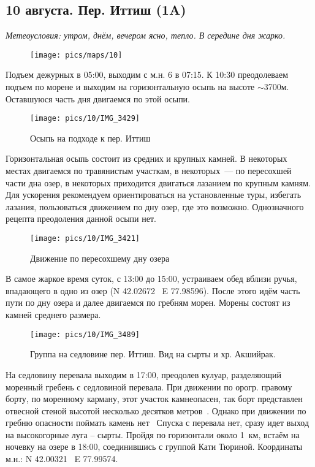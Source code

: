 \subsection{10 августа. Пер. Иттиш (1A)}
\textit{Метеоусловия: утром, днём, вечером ясно, тепло. В середине дня жарко.}

\begin{figure}[h!]
	\centering
		\texttt{[image: pics/maps/10]}
	\label{fig:10}
\end{figure}

Подъем дежурных в 05:00, выходим с м.н. 6 в 07:15. К 10:30 преодолеваем подъем по морене и выходим на горизонтальную осыпь на высоте $\sim$3700м. Оставшуюся часть дня двигаемся по этой осыпи.

\begin{figure}[h!]
	\centering
	\texttt{[image: pics/10/IMG\_3429]}
	\caption{Осыпь на подходе к пер. Иттиш}
	\label{fig:IMG_3429}
\end{figure}

Горизонтальная осыпь состоит из средних и крупных камней. В некоторых местах двигаемся по травянистым участкам, в некоторых~--- по пересохшей части дна озер, в некоторых приходится двигаться лазанием по крупным камням. Для ускорения рекомендуем ориентироваться на установленные туры, избегать лазания, пользоваться движением по дну озер, где это возможно. Однозначного рецепта преодоления данной осыпи нет.

\begin{figure}[h!]
	\centering
	\texttt{[image: pics/10/IMG\_3421]}
	\caption{Движение по пересохшему дну озера}
	\label{fig:IMG_3421}
\end{figure}

В самое жаркое время суток, с 13:00 до 15:00, устраиваем обед вблизи ручья, впадающего в одно из озер (N 42.02672\degree~ E 77.98596\degree). После этого идём часть пути по дну озера и далее двигаемся по гребням морен. Морены состоят из камней среднего размера.

\begin{figure}[h!]
	\centering
	\texttt{[image: pics/10/IMG\_3489]}
	\caption{Группа на седловине пер. Иттиш. Вид на сырты и хр. Акшийрак.}
	\label{fig:IMG_3489}
\end{figure}

На седловину перевала выходим в 17:00, преодолев кулуар, разделяющий моренный гребень с седловиной перевала. При движении по орогр. правому борту, по моренному карману, этот участок камнеопасен, так борт представлен отвесной стеной высотой несколько десятков метров~\cite{kovinov2021}. Однако при движении по гребню опасности поймать камень нет~\cite{tipsina2024} Спуска с перевала нет, сразу идет выход на высокогорные луга -- сырты. Пройдя по горизонтали около 1~км, встаём на ночевку на озере в 18:00, соединившись с группой Кати Тюриной. Координаты м.н.: N 42.00321\degree~ E 77.99574\degree.

